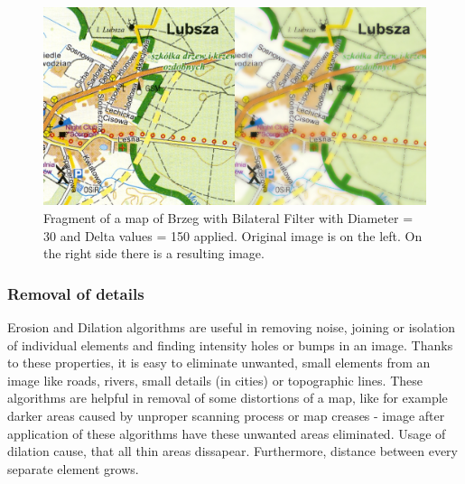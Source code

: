 \documentclass[a4paper,onecolumn,oneside,12pt]{memoir}
\begin{document}
\begin{figure}[!ht]
\begin{center}
\includegraphics[scale=1.5]{images/BilateralFilterResult.jpg}
\caption{Fragment of a map of Brzeg with Bilateral Filter with Diameter = 30 and Delta values = 150
applied. Original image is on the left. On the right side there is a resulting image.}
\label{bilateralFilterResult}
\end{center}
\end{figure}

\subsubsection{Removal of details}

Erosion and Dilation algorithms are useful in removing noise, joining or isolation of individual
elements and finding intensity holes or bumps in an image. Thanks to these properties, it is easy
to eliminate unwanted, small elements from an image like roads, rivers, small details (in cities) or
topographic lines. These algorithms are helpful in removal of some distortions of a map, like for
example darker areas caused by unproper scanning process or map creases - image after application of
these algorithms have these unwanted areas eliminated. Usage of dilation cause, that all thin areas
dissapear. Furthermore, distance between every separate element grows.
\end{document}
